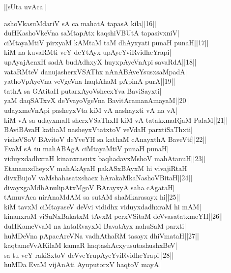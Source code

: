 \documentclass{article}
\begin{document}
\begin{center}
||sUta uvAca||
\end{center}

ashoVkasuMdariV sA ca mahatA tapasA kila||16||\\
duHKashoVkeVna saMtapAtx kaqshiVBUtA tapasivxniV|\\
ciMtayaMtiV pirxyaM kAMtaM taM dhAyxyati punaH punaH||17||\\
kiM na kuvaRMti veY deYtAyx upAyeYviRvidheYrapi|\\
upAyajAcnxH sadA budAdhxyX huyxpAyeVnApi savaRdA||18||\\
vataRMteV danujasherxVSAThx nAnABAveYsusxsaMpadA|\\
yathoVpAyeVna veVgeVna haqtAhaM pApinA purA||19||\\
tathA sa GAtitaH putarxAyoVshecxYva BaviSayxti|\\
yaM daqSATxvX deYvayoVgeVna BavitAramanAmayaM||20||\\
udayxmeVnApi pasheyxVta kiM vA nashayxti vA na vA|\\
kiM vA sa udayxmaH sherxVSaThxH kiM vA tatakxmaRjaM PalaM||21||\\
BAviBAvaH kathaM nasheyxVtatxtoV veVdaH parxtiSaThxti|\\
visheVSoV BAvitoV deYveYH sa kathaM cAnayxthA BaveVtf||22||\\
EvaM sA tu mahABAgA ciMtayaMtiV punaH punaH|\\
viduyxdadhxraH kinanxrasutx baqhadavxMshoV mahAtanuH||23||\\
EtanamxdheyxV mahAkAyaH pakASxBAyxM hi vivajiRtaH|\\
divxBujoV vaMshahasatxshacx hArakaMkaNashoVBitaH||24||\\
divayxgaMdhAnulipAtxMgoV BArayxyA saha cAgataH|\\
tAmuvAca nirAnaMdAM sa sutAM shaMkarasayx hi||25||\\
kiM tavxM ciMtayaseV deVvi vididhx viduyxdadhxraM hi mAM|\\
kinanxraM viSuNxBakatxM tAvxM perxVSitaM deVvasatatxmeYH||26||\\
duHKameVvaM na kataRvayxM BavatAyx nahuSaM parxti|\\
huMDeVna pApacAreVNa vadhAthaRM tasayx dhiVmataH||27||\\
kaqtameVvAKilaM kamaR haqtashAcxyusutashushxBeV|\\
sa tu veY rakiSxtoV deVveYrupAyeYviRvidheYrapi||28||\\
huMDa EvaM vijAnAti AyuputorxV haqtoV mayA|\\
\end{document}
